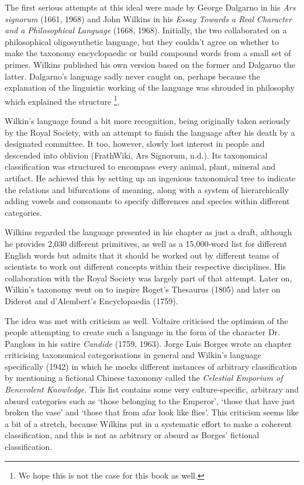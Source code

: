 The first serious attempts at this ideal were made by George Dalgarno in his {\it Ars signorum} (1661, 1968) and John Wilkins in his \textit{Essay Towards a Real Character and a Philosophical Language} (1668, 1968). Initially, the two collaborated on a philosophical oligosynthetic language, but they couldn’t agree on whether to make the taxonomy encyclopaedic or build compound words from a small set of primes. Wilkins published his own version based on the former and Dalgarno the latter. Dalgarno’s language sadly never caught on, perhaps because the explanation of the linguistic working of the language was shrouded in philosophy which explained the structure \footnote{We hope this is not the case for this book as well.}. 

Wilkin’s language found a bit more recognition, being originally taken seriously by the Royal Society, with an attempt to finish the language after his death by a designated committee. It too, however, slowly lost interest in people and descended into oblivion  (FrathWiki, Ars Signorum, n.d.). Its taxonomical classification was structured to encompass every animal, plant, mineral and artifact. He achieved this by setting up an ingenious taxonomical tree to indicate the relations and bifurcations of meaning, along with a system of hierarchically adding vowels and consonants to specify differences and species within different categories. 

Wilkins regarded the language presented in his chapter as just a draft, although he provides 2,030 different primitives, as well as a 15,000-word list for different English words but admits that it should be worked out by different teams of scientists to work out different concepts within their respective disciplines. His collaboration with the Royal Society was largely part of that attempt. Later on, Wilkin’s taxonomy went on to inspire Roget’s Thesaurus (1805) and later on Diderot and d’Alembert’s Encyclopaedia (1759).  

The idea was met with criticism as well. Voltaire criticised the optimism of the people attempting to create such a language in the form of the character Dr. Pangloss in his satire \textit{Candide} (1759, 1963). Jorge Luis Borges wrote an chapter criticising taxonomical categorisations in general and Wilkin’s language specifically (1942) in which he mocks different instances of arbitrary classification by mentioning a fictional Chinese taxonomy called the \textit{Celestial Emporium of Benevolent Knowledge}. This list contains some very culture-specific, arbitrary and absurd categories such as ‘those belonging to the Emperor’, ‘those that have just broken the vase’ and ‘those that from afar look like flies’. This criticism seems like a bit of a stretch, because Wilkins put in a systematic effort to make a coherent classification, and this is not as arbitrary or absurd as Borges’ fictional classification. 

